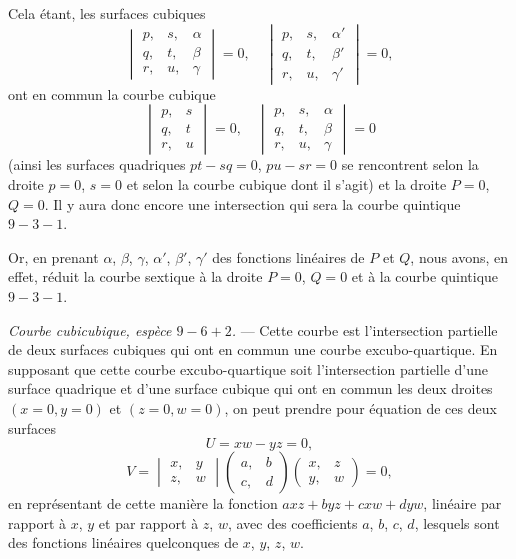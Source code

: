 \documentclass[11pt,a4paper]{article}
\begin{document}
Cela \'{e}tant, les surfaces cubiques
\[
\begin{vmatrix}
p, & s, & \alpha \\
q, & t, & \beta \\
r, & u, & \gamma
\end{vmatrix} = 0,
\quad
\begin{vmatrix}
p, & s, & \alpha' \\
q, & t, & \beta' \\
r, & u, & \gamma'
\end{vmatrix} = 0,
\]
ont en commun la courbe cubique
\[
\begin{vmatrix}
p, & s \\
q, & t \\
r, & u
\end{vmatrix} = 0,
\quad
\begin{vmatrix}
p, & s, & \alpha \\
q, & t, & \beta \\
r, & u, & \gamma
\end{vmatrix} = 0
\]
(ainsi les surfaces quadriques $pt - sq = 0$, $pu - sr = 0$ se rencontrent selon la droite $p = 0$, $s = 0$ et selon la courbe cubique dont il s'agit) et la droite $P = 0$, $Q = 0$. Il y aura donc encore une intersection qui sera la courbe quintique $9 - 3 - 1$.

\clearpage

Or, en prenant $\alpha$, $\beta$, $\gamma$, $\alpha'$, $\beta'$, $\gamma'$ des fonctions lin\'{e}aires de $P$ et $Q$, nous avons, en effet, r\'{e}duit la courbe sextique \`{a} la droite $P = 0$, $Q = 0$ et \`{a} la courbe quintique $9 - 3 - 1$.

\medskip
\noindent\textit{Courbe cubicubique, esp\`{e}ce $9 - 6 + 2$.} --- Cette courbe est l'intersection partielle de deux surfaces cubiques qui ont en commun une courbe excubo-quartique. En supposant que cette courbe excubo-quartique soit l'intersection partielle d'une surface quadrique et d'une surface cubique qui ont en commun les deux droites $(x = 0, y = 0)$ et $(z = 0, w = 0)$, on peut prendre pour \'{e}quation de ces deux surfaces
\[
U = xw - yz = 0,
\]
\[
V = \begin{vmatrix}
x, & y \\
z, & w
\end{vmatrix}
\begin{pmatrix}
a, & b \\
c, & d
\end{pmatrix}
\begin{pmatrix}
x, & z \\
y, & w
\end{pmatrix} = 0,
\]
en repr\'{e}sentant de cette mani\`{e}re la fonction $axz + byz + cxw + dyw$, lin\'{e}aire par rapport \`{a} $x$, $y$ et par rapport \`{a} $z$, $w$, avec des coefficients $a$, $b$, $c$, $d$, lesquels sont des fonctions lin\'{e}aires quelconques de $x$, $y$, $z$, $w$.
\end{document}
